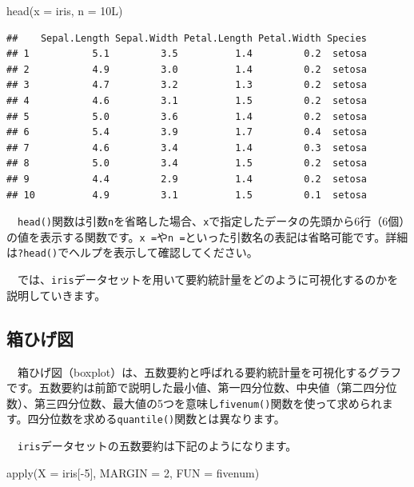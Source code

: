 \documentclass[
  12pt,
]{book}
\newenvironment{Shaded}{\begin{snugshade}}{\end{snugshade}}
\newcommand{\AttributeTok}[1]{\textcolor[rgb]{0.77,0.63,0.00}{#1}}
\newcommand{\DecValTok}[1]{\textcolor[rgb]{0.00,0.00,0.81}{#1}}
\newcommand{\FunctionTok}[1]{\textcolor[rgb]{0.00,0.00,0.00}{#1}}
\newcommand{\NormalTok}[1]{#1}
\newcommand{\SpecialCharTok}[1]{\textcolor[rgb]{0.00,0.00,0.00}{#1}}
\begin{document}
\begin{Shaded}
\begin{Highlighting}[numbers=left,,]
\FunctionTok{head}\NormalTok{(}\AttributeTok{x =}\NormalTok{ iris, }\AttributeTok{n =}\NormalTok{ 10L)}
\end{Highlighting}
\end{Shaded}

\begin{verbatim}
##    Sepal.Length Sepal.Width Petal.Length Petal.Width Species
## 1           5.1         3.5          1.4         0.2  setosa
## 2           4.9         3.0          1.4         0.2  setosa
## 3           4.7         3.2          1.3         0.2  setosa
## 4           4.6         3.1          1.5         0.2  setosa
## 5           5.0         3.6          1.4         0.2  setosa
## 6           5.4         3.9          1.7         0.4  setosa
## 7           4.6         3.4          1.4         0.3  setosa
## 8           5.0         3.4          1.5         0.2  setosa
## 9           4.4         2.9          1.4         0.2  setosa
## 10          4.9         3.1          1.5         0.1  setosa
\end{verbatim}

　\texttt{head()}関数は引数\texttt{n}を省略した場合、\texttt{x}で指定したデータの先頭から6行（6個）の値を表示する関数です。\texttt{x\ =}や\texttt{n\ =}といった引数名の表記は省略可能です。詳細は\texttt{?head()}でヘルプを表示して確認してください。

　では、\texttt{iris}データセットを用いて要約統計量をどのように可視化するのかを説明していきます。

\hypertarget{ux7bb1ux3072ux3052ux56f3}{%
\subsection{箱ひげ図}\label{ux7bb1ux3072ux3052ux56f3}}

　箱ひげ図（boxplot）は、五数要約と呼ばれる要約統計量を可視化するグラフです。五数要約は前節で説明した最小値、第一四分位数、中央値（第二四分位数）、第三四分位数、最大値の5つを意味し\texttt{fivenum()}関数を使って求められます。四分位数を求める\texttt{quantile()}関数とは異なります。

\newpage

　\texttt{iris}データセットの五数要約は下記のようになります。

\begin{Shaded}
\begin{Highlighting}[numbers=left,,]
\FunctionTok{apply}\NormalTok{(}\AttributeTok{X =}\NormalTok{ iris[}\SpecialCharTok{{-}}\DecValTok{5}\NormalTok{], }\AttributeTok{MARGIN =} \DecValTok{2}\NormalTok{, }\AttributeTok{FUN =}\NormalTok{ fivenum)}
\end{Highlighting}
\end{Shaded}
\end{document}
